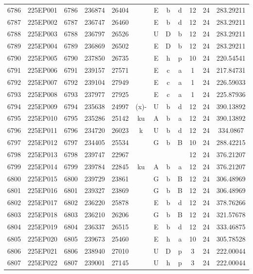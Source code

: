 \begin{tabular}{|*{12}{c|}}
6786 & 225EP001 & 6786 & 236874 & 26404 &  & E & b & d & 12 & 24 & 283.29211 \\ 
6787 & 225EP002 & 6787 & 236747 & 26460 &  & E & b & d & 12 & 24 & 283.29211 \\ 
6788 & 225EP003 & 6788 & 236797 & 26526 &  & U & D & b & 12 & 24 & 283.29211 \\ 
6789 & 225EP004 & 6789 & 236869 & 26502 &  & E & D & b & 12 & 24 & 283.29211 \\ 
6790 & 225EP005 & 6790 & 237850 & 26735 &  & E & h & p & 10 & 24 & 220.54541 \\ 
6791 & 225EP006 & 6791 & 239157 & 27571 &  & E & c & a & 1 & 24 & 217.84731 \\ 
6792 & 225EP007 & 6792 & 239104 & 27949 &  & E & c & a & 1 & 24 & 226.59033 \\ 
6793 & 225EP008 & 6793 & 237977 & 27925 &  & E & c & a & 1 & 24 & 225.87936 \\ 
6794 & 225EP009 & 6794 & 235638 & 24997 & (x)- & U & b & d & 12 & 24 & 390.13892 \\ 
6795 & 225EP010 & 6795 & 235286 & 25142 & ku & A & b & a & 12 & 24 & 390.13892 \\ 
6796 & 225EP011 & 6796 & 234720 & 26023 & k & U & b & d & 12 & 24 & 334.0867 \\ 
6797 & 225EP012 & 6797 & 234405 & 25534 &  & G & b & B & 10 & 24 & 288.42215 \\ 
6798 & 225EP013 & 6798 & 239747 & 22967 &  &  &  &  & 12 & 24 & 376.21207 \\ 
6799 & 225EP014 & 6799 & 239784 & 22845 & ku & A & b & a & 12 & 24 & 376.21207 \\ 
6800 & 225EP015 & 6800 & 239729 & 23861 &  & G & b & B & 12 & 24 & 306.48969 \\ 
6801 & 225EP016 & 6801 & 239327 & 23869 &  & G & b & B & 12 & 24 & 306.48969 \\ 
6802 & 225EP017 & 6802 & 236220 & 25878 &  & E & b & d & 12 & 24 & 378.76266 \\ 
6803 & 225EP018 & 6803 & 236210 & 26206 &  & G & b & B & 12 & 24 & 321.57678 \\ 
6804 & 225EP019 & 6804 & 236337 & 26515 &  & E & b & d & 12 & 24 & 333.46875 \\ 
6805 & 225EP020 & 6805 & 239673 & 25460 &  & E & h & a & 10 & 24 & 305.78528 \\ 
6806 & 225EP021 & 6806 & 238940 & 27010 &  & U & D & p & 3 & 24 & 222.00044 \\ 
6807 & 225EP022 & 6807 & 239001 & 27145 &  & U & h & p & 3 & 24 & 222.00044 \\ 

\end{tabular}
